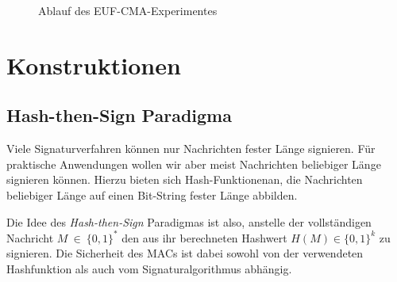 \begin{center}
  \begin{figure} 
  \caption{Ablauf des EUF-CMA-Experimentes}
  \label{fig:euf-cma}
\end{figure}
\end{center}

\section{Konstruktionen}

\subsection{Hash-then-Sign Paradigma}\indexHashSign
\label{subsec:hash-then-sign} Viele Signaturverfahren können nur
Nachrichten fester Länge signieren. Für praktische Anwendungen wollen
wir aber meist Nachrichten beliebiger Länge signieren können. Hierzu
bieten sich Hash-Funktionen\indexCryptHashFunction an, die Nachrichten
beliebiger Länge auf einen Bit-String fester Länge abbilden.

Die Idee des \emph{Hash-then-Sign} Paradigmas ist also, anstelle der
vollständigen Nachricht $M~\in~\{0,1\}^*$ den aus ihr berechneten
Hashwert $H(M) \in \{0,1\}^k$ zu signieren. Die Sicherheit des MACs ist
dabei sowohl von der verwendeten Hashfunktion als auch vom
Signaturalgorithmus abhängig.~\\

